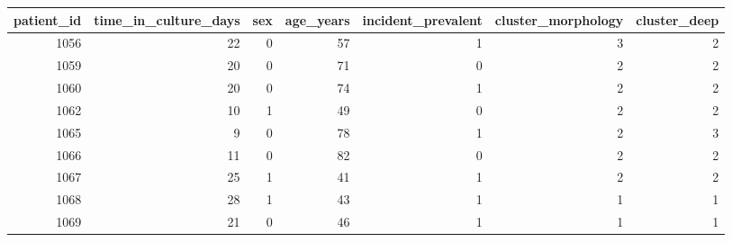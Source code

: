 \begin{tabular}{rrrrrrr}
\toprule
patient\_id & time\_in\_culture\_days & sex & age\_years & incident\_prevalent & cluster\_morphology & cluster\_deep \\
\midrule
1056 & 22 & 0 & 57 & 1 & 3 & 2 \\
1059 & 20 & 0 & 71 & 0 & 2 & 2 \\
1060 & 20 & 0 & 74 & 1 & 2 & 2 \\
1062 & 10 & 1 & 49 & 0 & 2 & 2 \\
1065 & 9 & 0 & 78 & 1 & 2 & 3 \\
1066 & 11 & 0 & 82 & 0 & 2 & 2 \\
1067 & 25 & 1 & 41 & 1 & 2 & 2 \\
1068 & 28 & 1 & 43 & 1 & 1 & 1 \\
1069 & 21 & 0 & 46 & 1 & 1 & 1 \\
\bottomrule
\end{tabular}

